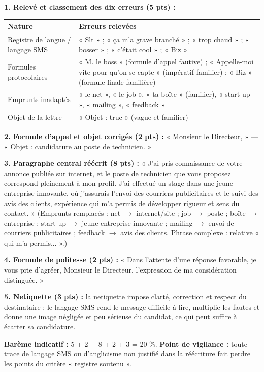 \documentclass[11pt]{article}
\begin{document}
\begin{corrige}
\textbf{1. Relevé et classement des dix erreurs (5 pts) :}
\begin{center}
\begin{tabularx}{\linewidth}{|l|X|}
\hline
\rowcolor{popblueL} \textbf{Nature} & \textbf{Erreurs relevées} \\
\hline
Registre de langue / langage SMS & « Slt » ; « ça m'a grave branché » ; « trop chaud » ; « bosser » ; « c'était cool » ; « Biz » \\
\hline
Formules protocolaires & « M. le boss » (formule d'appel fautive) ; « Appelle-moi vite pour qu'on se capte » (impératif familier) ; « Biz » (formule finale familière) \\
\hline
Emprunts inadaptés & « le net », « le job », « ta boîte » (familier), « start-up », « mailing », « feedback » \\
\hline
Objet de la lettre & « Objet : truc » (vague et familier) \\
\hline
\end{tabularx}
\end{center}

\textbf{2. Formule d'appel et objet corrigés (2 pts) :} « Monsieur le Directeur, » — « Objet : candidature au poste de technicien. »

\textbf{3. Paragraphe central réécrit (8 pts) :} « J'ai pris connaissance de votre annonce publiée sur internet, et le poste de technicien que vous proposez correspond pleinement à mon profil. J'ai effectué un stage dans une jeune entreprise innovante, où j'assurais l'envoi des courriers publicitaires et le suivi des avis des clients, expérience qui m'a permis de développer rigueur et sens du contact. » (Emprunts remplacés : net $\rightarrow$ internet/site ; job $\rightarrow$ poste ; boîte $\rightarrow$ entreprise ; start-up $\rightarrow$ jeune entreprise innovante ; mailing $\rightarrow$ envoi de courriers publicitaires ; feedback $\rightarrow$ avis des clients. Phrase complexe : relative « qui m'a permis... ».)

\textbf{4. Formule de politesse (2 pts) :} « Dans l'attente d'une réponse favorable, je vous prie d'agréer, Monsieur le Directeur, l'expression de ma considération distinguée. »

\textbf{5. Netiquette (3 pts) :} la netiquette impose clarté, correction et respect du destinataire ; le langage SMS rend le message difficile à lire, multiplie les fautes et donne une image négligée et peu sérieuse du candidat, ce qui peut suffire à écarter sa candidature.

\textbf{Barème indicatif :} 5 + 2 + 8 + 2 + 3 = 20 \%. \textbf{Point de vigilance :} toute trace de langage SMS ou d'anglicisme non justifié dans la réécriture fait perdre les points du critère « registre soutenu ».
\end{corrige}
\end{document}
